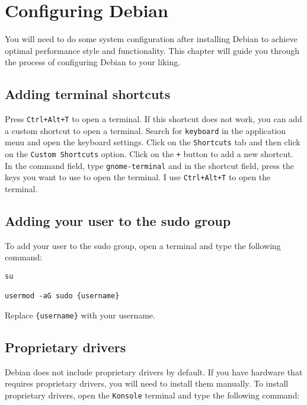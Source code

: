 \chapter{Configuring Debian}

You will need to do some system configuration after installing Debian to achieve optimal performance style and functionality. This chapter will guide you through the process of configuring Debian to your liking.

\section{Adding terminal shortcuts}

Press \texttt{Ctrl+Alt+T} to open a terminal. If this shortcut does not work, you can add a custom shortcut to open a terminal. Search for \texttt{keyboard} in the application menu and open the keyboard settings. Click on the \texttt{Shortcuts} tab and then click on the \texttt{Custom Shortcuts} option. Click on the \texttt{+} button to add a new shortcut. In the command field, type \texttt{gnome-terminal} and in the shortcut field, press the keys you want to use to open the terminal. I use \texttt{Ctrl+Alt+T} to open the terminal.

\section{Adding your user to the sudo group}

To add your user to the sudo group, open a terminal and type the following command:

\begin{lstlisting}
su

usermod -aG sudo {username}
\end{lstlisting}

Replace \texttt{\{username\}} with your username.

\section{Proprietary drivers}

Debian does not include proprietary drivers by default. If you have hardware that requires proprietary drivers, you will need to install them manually. To install proprietary drivers, open the \texttt{Konsole} terminal and type the following command:

